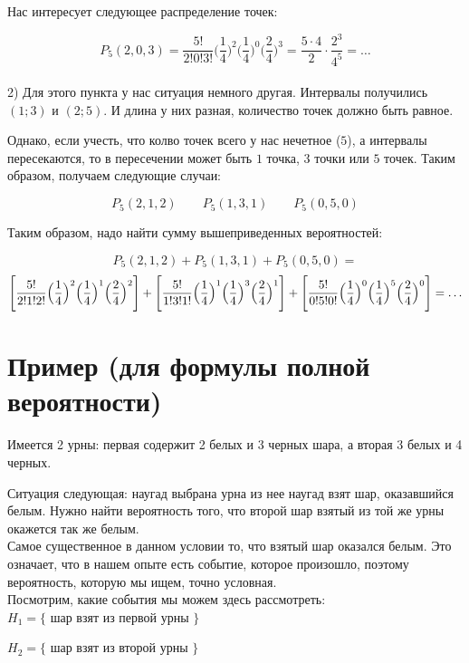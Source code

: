 \documentclass{article}
\begin{document}
Нас интересует следующее распределение точек:

$$ P_5(2, 0, 3) = \frac{5!}{2! 0! 3!}\Biggl(\frac{1}{4}\Biggr)^2 \Biggl(\frac{1}{4}\Biggr)^0 \Biggl(\frac{2}{4}\Biggr)^3 = \frac{5 \cdot 4}{2} \cdot \frac{2^3}{4^5} = \ldots$$
\\

2) Для этого пункта у нас ситуация немного другая. Интервалы получились $(1; 3)$ и $(2; 5)$. И длина у них разная, количество точек должно быть равное.

Однако, если учесть, что колво точек всего у нас нечетное ($5$), а интервалы пересекаются, то в пересечении может быть $1$ точка, $3$ точки или $5$ точек. Таким образом, получаем следующие случаи:

$$P_5(2, 1, 2)\qquad P_5(1, 3, 1)\qquad P_5(0, 5, 0)$$

Таким образом, надо найти сумму вышеприведенных вероятностей:

$$P_5(2, 1, 2) + P_5(1, 3, 1) + P_5(0, 5, 0) = $$
$$\Biggl[\frac{5!}{2! 1! 2!}\Bigl(\frac{1}{4}\Bigr)^2 \Bigl(\frac{1}{4}\Bigr)^1 \Bigl(\frac{2}{4}\Bigr)^2\Biggr] +
\Biggl[\frac{5!}{1! 3! 1!}\Bigl(\frac{1}{4}\Bigr)^1 \Bigl(\frac{1}{4}\Bigr)^3 \Bigl(\frac{2}{4}\Bigr)^1\Biggr] +
\Biggl[\frac{5!}{0! 5! 0!}\Bigl(\frac{1}{4}\Bigr)^0 \Bigl(\frac{1}{4}\Bigr)^5 \Bigl(\frac{2}{4}\Bigr)^0\Biggr] = \ldots$$

\section{Пример (для формулы полной вероятности)}

Имеется 2 урны: первая содержит 2 белых и 3 черных шара, а вторая 3 белых и 4 черных.

Ситуация следующая: наугад выбрана урна из нее наугад взят шар, оказавшийся белым. Нужно найти вероятность того, что второй шар взятый из той же урны окажется так же белым.
\\

Самое существенное в данном условии то, что взятый шар оказался белым. Это означает, что в нашем опыте есть событие, которое произошло, поэтому вероятность, которую мы ищем, точно условная.
\\

Посмотрим, какие события мы можем здесь рассмотреть:
\\

$H_1 = \{$ шар взят из первой урны $\}$

$H_2 = \{$ шар взят из второй урны $\}$
\end{document}
